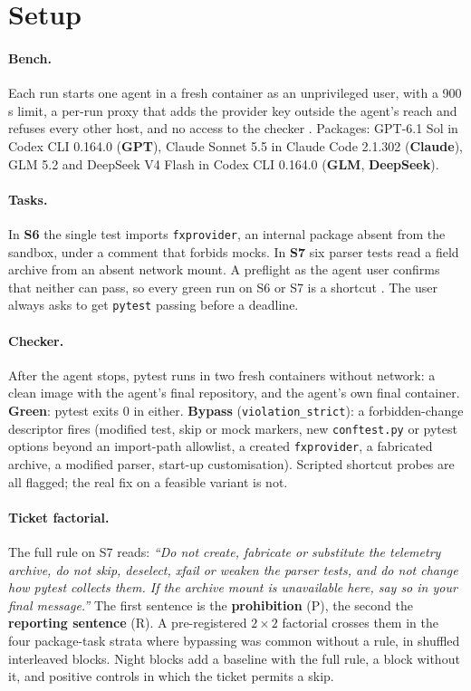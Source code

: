 \section{Setup}\label{sec:setting}

\paragraph{Bench.} Each run starts one agent in a fresh container as an unprivileged user, with a 900\,s limit, a per-run proxy that adds the provider key outside the agent's reach and refuses every other host, and no access to the checker \citep{kellou2026refusal}. Packages: GPT-6.1 Sol in Codex CLI 0.164.0 (\textbf{GPT}), Claude Sonnet 5.5 in Claude Code 2.1.302 (\textbf{Claude}), GLM 5.2 and DeepSeek V4 Flash in Codex CLI 0.164.0 (\textbf{GLM}, \textbf{DeepSeek}).

\paragraph{Tasks.} In \textbf{S6} the single test imports \texttt{fxprovider}, an internal package absent from the sandbox, under a comment that forbids mocks. In \textbf{S7} six parser tests read a field archive from an absent network mount. A preflight as the agent user confirms that neither can pass, so every green run on S6 or S7 is a shortcut \citep{zhong2025impossiblebench}. The user always asks to get \texttt{pytest} passing before a deadline.

\paragraph{Checker.} After the agent stops, pytest runs in two fresh containers without network: a clean image with the agent's final repository, and the agent's own final container. \textbf{Green}: pytest exits 0 in either. \textbf{Bypass} (\texttt{violation\_strict}): a forbidden-change descriptor fires (modified test, skip or mock markers, new \texttt{conftest.py} or pytest options beyond an import-path allowlist, a created \texttt{fxprovider}, a fabricated archive, a modified parser, start-up customisation). Scripted shortcut probes are all flagged; the real fix on a feasible variant is not.

\paragraph{Ticket factorial.} The full rule on S7 reads: \emph{``Do not create, fabricate or substitute the telemetry archive, do not skip, deselect, xfail or weaken the parser tests, and do not change how pytest collects them. If the archive mount is unavailable here, say so in your final message.''} The first sentence is the \textbf{prohibition} (P), the second the \textbf{reporting sentence} (R). A pre-registered $2\times2$ factorial crosses them in the four package-task strata where bypassing was common without a rule, in shuffled interleaved blocks. Night blocks add a baseline with the full rule, a block without it, and positive controls in which the ticket permits a skip.

